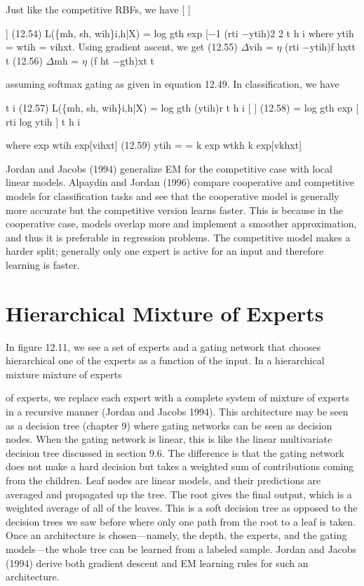 Just like the competitive RBFs, we have [ ]

] (12.54) L(\{mh, sh, wih\}i,h|X) = log gth exp [$-$1 (rti $-$ytih)2 2 t h i where ytih = wtih = vihxt. Using gradient ascent, we get (12.55) $\Delta$vih = $\eta$ (rti $-$ytih)f hxtt t (12.56) $\Delta$mh = $\eta$ (f ht $-$gth)xt t

assuming softmax gating as given in equation 12.49. In classification, we have

t i (12.57) L(\{mh, sh, wih\}i,h|X) = log gth (ytih)r t h i [ ] (12.58) = log gth exp [ rti log ytih ] t h i

where exp wtih exp[vihxt] (12.59) ytih = = k exp wtkh k exp[vkhxt]

Jordan and Jacobs (1994) generalize EM for the competitive case with local linear models. Alpaydin and Jordan (1996) compare cooperative and competitive models for classification tasks and see that the cooperative model is generally more accurate but the competitive version learns faster. This is because in the cooperative case, models overlap more and implement a smoother approximation, and thus it is preferable in regression problems. The competitive model makes a harder split; generally only one expert is active for an input and therefore learning is faster.

\section{Hierarchical Mixture of Experts}

In figure 12.11, we see a set of experts and a gating network that chooses hierarchical one of the experts as a function of the input. In a hierarchical mixture mixture of experts

of experts, we replace each expert with a complete system of mixture of experts in a recursive manner (Jordan and Jacobs 1994). This architecture may be seen as a decision tree (chapter 9) where gating networks can be seen as decision nodes. When the gating network is linear, this is like the linear multivariate decision tree discussed in section 9.6. The difference is that the gating network does not make a hard decision but takes a weighted sum of contributions coming from the children. Leaf nodes are linear models, and their predictions are averaged and propagated up the tree. The root gives the final output, which is a weighted average of all of the leaves. This is a soft decision tree as opposed to the decision trees we saw before where only one path from the root to a leaf is taken. Once an architecture is chosen---namely, the depth, the experts, and the gating models---the whole tree can be learned from a labeled sample. Jordan and Jacobs (1994) derive both gradient descent and EM learning rules for such an architecture.

